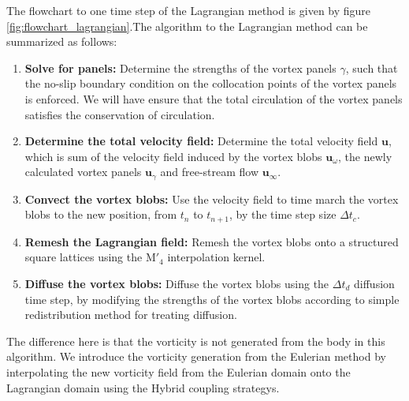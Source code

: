 The flowchart to one time step of the Lagrangian method is given by figure \ref{fig:flowchart_lagrangian}.The algorithm to the Lagrangian method can be summarized as follows:

	\begin{enumerate}
	\item \textbf{Solve for panels:} Determine the strengths of the vortex panels $\gamma$, such that the no-slip boundary condition on the collocation points of the vortex panels is enforced. We will have ensure that the total circulation of the vortex panels satisfies the conservation of circulation.
	\item \textbf{Determine the total velocity field:} Determine the total velocity field $\mathbf{u}$, which is sum of the velocity field induced by the vortex blobs $\mathbf{u}_{\omega}$, the newly calculated vortex panels $\mathbf{u}_{\gamma}$ and free-stream flow $\mathbf{u}_{\infty}$. 
	\item \textbf{Convect the vortex blobs:} Use the velocity field to time march the vortex blobs to the new position, from $t_n$ to $t_{n+1}$, by the time step size $\Delta t_c$.
	\item \textbf{Remesh the Lagrangian field:} Remesh the vortex blobs onto a structured square lattices using the $\mathrm{M}'_4$ interpolation kernel.
	\item \textbf{Diffuse the vortex blobs:} Diffuse the vortex blobs using the $\Delta t_d$ diffusion time step, by modifying the strengths of the vortex blobs according to simple redistribution method for treating diffusion.
	\end{enumerate}

The difference here is that the vorticity is not generated from the body in this algorithm. We introduce the vorticity generation from the Eulerian method by interpolating the new vorticity field from the Eulerian domain onto the Lagrangian domain using the Hybrid coupling strategys.

